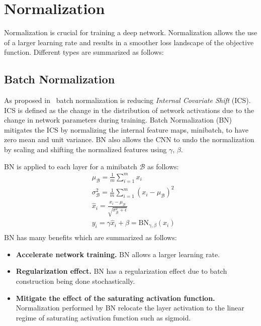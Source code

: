 \section{Normalization}
Normalization is crucial for training a deep network. Normalization allows the use of a larger learning rate and results in a smoother loss landscape of the objective function. Different types are summarized as follows:
\subsection{Batch Normalization}
As proposed in~\cite{ioffe2015batch} batch normalization is reducing {\em  Internal Covariate Shift} (ICS). ICS is defined as the change in the distribution of network activations due to the change in network parameters during training. Batch Normalization (BN) mitigates the ICS by normalizing the internal feature maps, minibatch, to have zero mean and unit variance. BN also allows the CNN to undo the normalization by scaling and shifting the normalized features using $\gamma$, $\beta$. 

BN is applied to each layer for a minibatch $\mathcal{B}$ as follows\cite{ioffe2015batch}:
\begin{equation}
\begin{split}
    & \mu_{\mathcal{B}} = \frac{1}{m}\sum^{m}_{i=1}x_{i}\\
    &  \sigma^{2}_{\mathcal{B}} = \frac{1}{m}\sum^{m}_{i=1}\left(x_{i}-\mu_{\mathcal{B}}\right)^{2}\\
    &  \hat{x}_{i} = \frac{x_{i} - \mu_{\mathcal{B}}}{\sqrt{\sigma^{2}_{\mathcal{B}}+\epsilon}} \\
    &  y_{i} = \gamma\hat{x}_{i} + \beta = \text{BN}_{\gamma, \beta}\left(x_{i}\right) \\
\end{split}
\end{equation}
BN has many benefits which are summarized as follows:
\begin{itemize}
    \item \textbf{Accelerate network training.} BN allows a larger learning rate.
    \item \textbf{Regularization effect.} BN has a regularization effect due to batch construction being done stochastically.
    \item \textbf{Mitigate the effect of the saturating activation function.} Normalization performed by BN relocate the layer activation to the linear regime of saturating activation function such as sigmoid.
\end{itemize}

